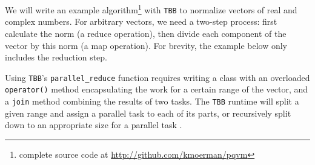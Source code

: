 \documentclass[a4paper,11pt, oneside]{report}
\newcommand{\code}[1]{\texttt{#1}}
\begin{document}
\example We will write an example algorithm\footnote{complete source code at \url{http://github.com/kmoerman/pqvm}} with \code{TBB} to normalize vectors of real and complex numbers. For arbitrary vectors, we need a two-step process: first calculate the norm (a  reduce operation), then divide each component of the vector by this norm (a map operation). For brevity, the example below only includes the reduction step.


Using \code{TBB}'s \code{parallel\_reduce} function requires writing a class with an overloaded \code{operator()} method encapsulating the work for a certain range of the vector, and a \code{join} method combining the results of two tasks. The \code{TBB} runtime will split a given range and assign a parallel task to each of its parts, or recursively split down to an appropriate size for a parallel task \cite{tbb}.

\end{document}
